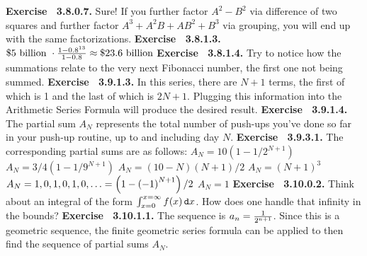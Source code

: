  {\noindent \protect \bf  Exercise ~3.8.0.7.} Sure! If you further factor $A^2-B^2$ via difference of two squares and further factor $A^3+A^2B+AB^2+B^3$ via grouping, you will end up with the same factorizations. \protect \newline  \protect \newline  
 {\noindent \protect \bf  Exercise ~3.8.1.3.} $\protect \$5 \protect \text  { billion }\cdot \protect \frac  {1-0.8^{13}}{1-0.8}\approx \protect \$23.6 \protect \text  { billion}$ \protect \newline  \protect \newline  
 {\noindent \protect \bf  Exercise ~3.8.1.4.} Try to notice how the summations relate to the very next Fibonacci number, the first one not being summed. \protect \newline  \protect \newline  
 {\noindent \protect \bf  Exercise ~3.9.1.3.} In this series, there are $N+1$ terms, the first of which is 1 and the last of which is $2N+1$. Plugging this information into the Arithmetic Series Formula will produce the desired result.  \protect \newline  \protect \newline  
 {\noindent \protect \bf  Exercise ~3.9.1.4.} The partial sum $A_N$ represents the total number of push-ups you've done so far in your push-up routine, up to and including day $N$. \protect \newline  \protect \newline  
 {\noindent \protect \bf  Exercise ~3.9.3.1.} The corresponding partial sums are as follows: \textbullet $A_N=10\left (1-1/2^{N+1}\right )$ \textbullet $A_N=3/4\left (1-1/9^{N+1}\right )$ \textbullet $A_N=\left (10-N\right )\left (N+1\right )/2$ \textbullet $A_N=(N+1)^3$ \textbullet $A_N=1,0,1,0,1,0,\protect \ldots  =\left (1-\left (-1\right )^{N+1}\right )/2$ \textbullet $A_N=1$  \protect \newline  \protect \newline  
 {\noindent \protect \bf  Exercise ~3.10.0.2.} Think about an integral of the form $\intop _{x=0}^{x=\infty }f(x)\mathop {}\protect \tmspace  -\thinmuskip {.1667em}\protect \mathtt  {d}x $. How does one handle that infinity in the bounds? \protect \newline  \protect \newline  
 {\noindent \protect \bf  Exercise ~3.10.1.1.} The sequence is $a_n=\protect \frac  {1}{2^{n+1}}$. Since this is a geometric sequence, the finite geometric series formula can be applied to then find the sequence of partial sums $A_N$. \protect \newline  \protect \newline  
